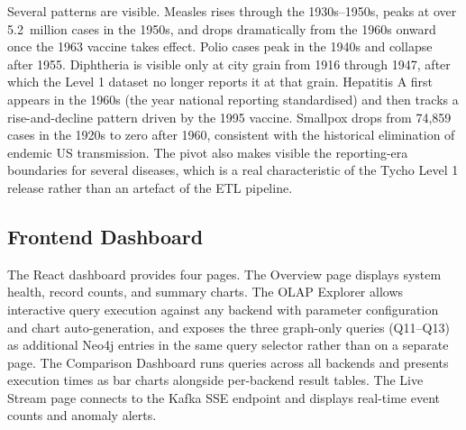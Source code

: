 \documentclass[12pt,a4paper]{article}
\begin{document}
Several patterns are visible. Measles rises through the 1930s--1950s, peaks at over 5.2~million cases in the 1950s, and drops dramatically from the 1960s onward once the 1963 vaccine takes effect. Polio cases peak in the 1940s and collapse after 1955. Diphtheria is visible only at city grain from 1916 through 1947, after which the Level 1 dataset no longer reports it at that grain. Hepatitis A first appears in the 1960s (the year national reporting standardised) and then tracks a rise-and-decline pattern driven by the 1995 vaccine. Smallpox drops from 74{,}859 cases in the 1920s to zero after 1960, consistent with the historical elimination of endemic US transmission. The pivot also makes visible the reporting-era boundaries for several diseases, which is a real characteristic of the Tycho Level 1 release rather than an artefact of the ETL pipeline.

\subsection{Frontend Dashboard}

The React dashboard provides four pages. The Overview page displays system health, record counts, and summary charts. The OLAP Explorer allows interactive query execution against any backend with parameter configuration and chart auto-generation, and exposes the three graph-only queries (Q11--Q13) as additional Neo4j entries in the same query selector rather than on a separate page. The Comparison Dashboard runs queries across all backends and presents execution times as bar charts alongside per-backend result tables. The Live Stream page connects to the Kafka SSE endpoint and displays real-time event counts and anomaly alerts.
\end{document}
